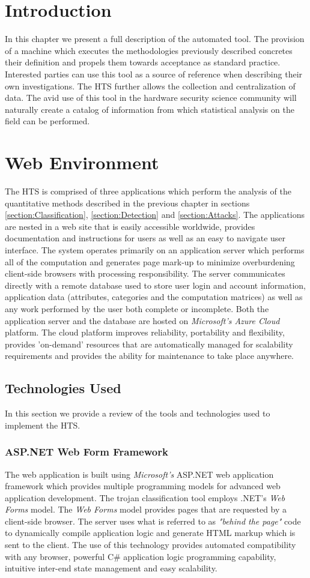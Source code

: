 \label{chapter:eval}
\section{Introduction}
In this chapter we present a full description of the automated tool. The provision of a machine which executes the methodologies previously described concretes their definition and propels them towards acceptance as standard practice. Interested parties can use this tool as a source of reference when describing their own investigations. The HTS further allows the collection and centralization of data. The avid use of this tool in the hardware security science community will naturally create a catalog of information from which statistical analysis on the field can be performed.  
\section{Web Environment}
The HTS is comprised of three applications which perform the analysis of the quantitative methods described in the previous chapter in sections \ref{section:Classification}, \ref{section:Detection} and \ref{section:Attacks}. The applications are nested in a web site that is easily accessible worldwide, provides documentation and instructions for users as well as an easy to navigate user interface. The system operates primarily on an application server which performs all of the computation and generates page mark-up to minimize overburdening client-side browsers with processing responsibility. The server communicates directly with a remote database used to store user login and account information, application data (attributes, categories and the computation matrices) as well as any work performed by the user both complete or incomplete. Both the application server and the database are hosted on \textit{Microsoft's Azure Cloud} platform. The cloud platform improves reliability, portability and flexibility, provides 'on-demand' resources that are automatically managed for scalability requirements and provides the ability for maintenance to take place anywhere.
\subsection{Technologies Used}
In this section we provide a review of the tools and technologies used to implement the HTS. 
\subsubsection{ASP.NET Web Form Framework}
The web application is built using \textit{Microsoft's} ASP.NET web application framework \cite{ASP} which provides multiple programming models for advanced web application development. The trojan classification tool employs .NET's  \textit{Web Forms} model. The \textit{Web Forms} model provides pages that are requested by a client-side browser. The server uses what is referred to as \textit{"behind the page"} code to dynamically compile application logic and generate HTML markup which is sent to the client. The use of this technology provides automated compatibility with any browser, powerful C\# application logic programming capability, intuitive inter-end state management and easy scalability.

